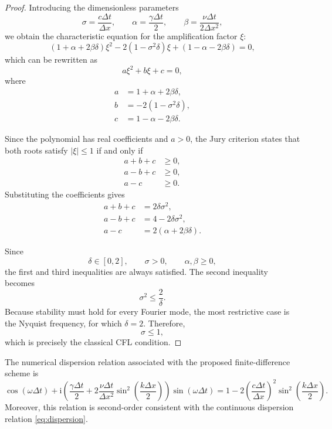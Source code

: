 \documentclass{Configuration_Files/PoliMi3i_thesis}
\newif\ifshowthesischanges
\DeclareRobustCommand{\thesischange}[2]{%
    \ifshowthesischanges
        \textcolor{#1}{#2}%
    \else
        #2%
    \fi
}
\def\thesischange#1#2{#2}%
\begin{document}
\begin{proof}
Introducing the dimensionless parameters
\begin{equation*}
\sigma=\frac{c\Delta t}{\Delta x},
\qquad
\alpha=\frac{\gamma\Delta t}{2},
\qquad
\beta=\frac{\nu\Delta t}{2\Delta x^2},
\end{equation*}
we obtain the \thesischange{red}{characteristic equation for the amplification factor $\xi$}:
\begin{equation*}
(1+\alpha+2\beta\delta)\xi^2
-2(1-\sigma^2\delta)\xi
+(1-\alpha-2\beta\delta)=0,
\end{equation*}
which can be rewritten as
\begin{equation*}
a\xi^2+b\xi+c=0,
\end{equation*}
where
\begin{align*}
a&=1+\alpha+2\beta\delta,\\
b&=-2(1-\sigma^2\delta),\\
c&=1-\alpha-2\beta\delta.
\end{align*}

Since the polynomial has real coefficients and $a>0$, the Jury criterion \citep[cfr.][Chapter~3, \S3.5, equations~(3.14), (3.21), and~(3.46)--(3.48)]{jury_theory_1973} states
that both roots satisfy $|\xi|\le1$ if and only if
\begin{align*}
a+b+c&\ge0,\\
a-b+c&\ge0,\\
a-c&\ge0.
\end{align*}
Substituting the coefficients gives
\begin{align*}
a+b+c&=2\delta\sigma^2,\\
a-b+c&=4-2\delta\sigma^2,\\
a-c&=2(\alpha+2\beta\delta).
\end{align*}

Since
\[
\delta\in[0,2],
\qquad
\sigma>0, \qquad \alpha,\beta\ge0,
\]
the first and third inequalities are always satisfied. The second inequality
becomes
\begin{equation*}
\sigma^2\le\frac{2}{\delta}.
\end{equation*}
Because stability must hold for every Fourier mode, the most restrictive case
is the Nyquist frequency, for which $\delta=2$. Therefore,
\begin{equation*}
\sigma\le1,
\end{equation*}
which is precisely the classical CFL condition.
\end{proof}

\begin{proposition}
The numerical dispersion relation associated with the proposed finite-difference
scheme is
\begin{equation*}
\cos(\omega\Delta t)
+
\mathrm{i}
\left(
\frac{\gamma\Delta t}{2}
+
2\frac{\nu\Delta t}{\Delta x^2}
\sin^2\!\left(\frac{k\Delta x}{2}\right)
\right)
\sin(\omega\Delta t)
=
1
-
2
\left(
\frac{c\Delta t}{\Delta x}
\right)^2
\sin^2\!\left(\frac{k\Delta x}{2}\right).
\end{equation*}
Moreover, this relation is second-order consistent with the continuous
dispersion relation \eqref{eq:dispersion}.
\end{proposition}
\end{document}
